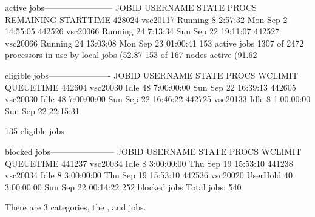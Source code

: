 \begin{prompt}
active jobs------------------------
JOBID     USERNAME  STATE PROCS REMAINING          STARTTIME
428024    vsc20117  Running   8   2:57:32  Mon Sep  2 14:55:05
442526    vsc20066  Running  24   7:13:34  Sun Sep 22 19:11:07
442527    vsc20066  Running  24  13:03:08  Mon Sep 23 01:00:41
153 active jobs 1307 of 2472 processors in use by local jobs (52.87%
153 of 167 nodes active      (91.62%

eligible jobs----------------------
JOBID     USERNAME  STATE PROCS   WCLIMIT            QUEUETIME
442604    vsc20030   Idle  48  7:00:00:00  Sun Sep 22 16:39:13
442605    vsc20030   Idle  48  7:00:00:00  Sun Sep 22 16:46:22
442725    vsc20133   Idle   8  1:00:00:00  Sun Sep 22 22:15:31

135 eligible jobs

blocked jobs-----------------------
JOBID   USERNAME     STATE PROCS WCLIMIT            QUEUETIME
441237  vsc20034      Idle   8 3:00:00:00 Thu Sep 19 15:53:10
441238  vsc20034      Idle   8 3:00:00:00 Thu Sep 19 15:53:10
442536  vsc20020  UserHold  40 3:00:00:00 Sun Sep 22 00:14:22
252 blocked jobs
Total jobs:  540
\end{prompt}
\fi

There are 3 categories, the ,  and  jobs.

